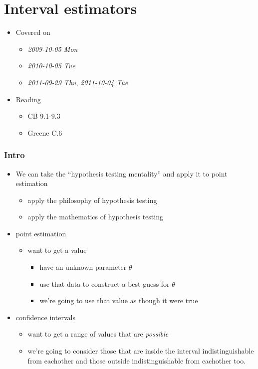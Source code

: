 
\part{Interval estimators}

\begin{itemize}
\item Covered on
\begin{itemize}
\item \textit{2009-10-05 Mon}
\item \textit{2010-10-05 Tue}
\item \textit{2011-09-29 Thu}, \textit{2011-10-04 Tue}
\end{itemize}
\item Reading
\begin{itemize}
\item CB 9.1-9.3
\item Greene C.6
\end{itemize}
\end{itemize}
\section{Intro}
\label{sec-1}

\begin{itemize}
\item We can take the ``hypothesis testing mentality'' and apply it to
      point estimation
\begin{itemize}
\item apply the philosophy of hypothesis testing
\item apply the mathematics of hypothesis testing
\end{itemize}
\item point estimation
\begin{itemize}
\item want to get a value
\begin{itemize}
\item have an unknown parameter $\theta$
\item use that data to construct a best guess for $\theta$
\item we're going to use that value as though it were true
\end{itemize}
\end{itemize}
\item confidence intervals
\begin{itemize}
\item want to get a range of values that are \emph{possible}
\item we're going to consider those that are inside the interval
        indistinguishable from eachother and those outside
        indistinguishable from eachother too.
\end{itemize}
\end{itemize}
